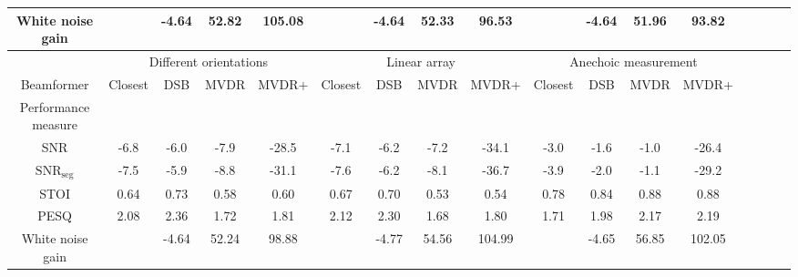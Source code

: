 \begin{sidewaystable}[h]
\begin{adjustbox}{max width=\textwidth}
\begin{tabular}{|c|c|c|c|c|c|c|c|c|c|c|c|c|c|c|c|c|}
White noise gain 		&  	  & -4.64 & 52.82 & 105.08 &   & -4.64 & 52.33 & 96.53 &  		& -4.64	& 51.96 & 93.82 \\ \hline

						& \multicolumn{4}{c|}{Different orientations}& \multicolumn{4}{c|}{Linear array} 	& \multicolumn{4}{c|}{Anechoic measurement} \\ \hline

Beamformer				& Closest  	& DSB 	& MVDR 	& MVDR+ 		& Closest  	& DSB 	& MVDR 	& MVDR+ 	& Closest  	& DSB 	& MVDR 	& MVDR+ 	\\ \hline

Performance measure 	&  			&  		&  		&  				&  			&  		&  		&  			&			&		&		&			\\

SNR 					& -6.8		& -6.0 	& -7.9 	& -28.5 		& -7.1		& -6.2	& -7.2 	& -34.1 	& -3.0		& -1.6	& -1.0	& -26.4		  \\
								
$\text{SNR}_\text{seg}$ & -7.5		& -5.9 	& -8.8 	& -31.1 		& -7.6		& -6.2	& -8.1 	& -36.7 	& -3.9		& -2.0	& -1.1	& -29.2		  \\
								
STOI    				& 0.64		& 0.73 	& 0.58 	& 0.60 			& 0.67		& 0.70	& 0.53 	& 0.54 		& 0.78		& 0.84	& 0.88	& 0.88		  \\
								
PESQ  					& 2.08		& 2.36 	& 1.72 	& 1.81 			& 2.12 		& 2.30	& 1.68 	& 1.80 		& 1.71		& 1.98	& 2.17	& 2.19		  \\
					
White noise gain 		& 			& -4.64 & 52.24 & 98.88 		&  			& -4.77 & 54.56 & 104.99  	&			& -4.65	& 56.85	& 102.05		 \\

\hline
\end{tabular}
\end{adjustbox}
\end{sidewaystable}







